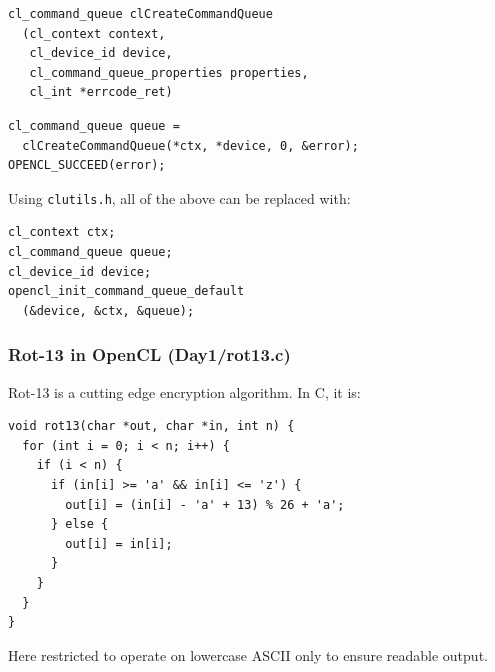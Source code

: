 \documentclass{beamer}
\begin{document}
\begin{frame}

\begin{lstlisting}[backgroundcolor=\color{lightgray}]
cl_command_queue clCreateCommandQueue
  (cl_context context,
   cl_device_id device,
   cl_command_queue_properties properties,
   cl_int *errcode_ret)
\end{lstlisting}

\begin{lstlisting}
cl_command_queue queue =
  clCreateCommandQueue(*ctx, *device, 0, &error);
OPENCL_SUCCEED(error);
\end{lstlisting}

  Using \texttt{clutils.h}, all of the above can be replaced with:

\begin{lstlisting}
cl_context ctx;
cl_command_queue queue;
cl_device_id device;
opencl_init_command_queue_default
  (&device, &ctx, &queue);
\end{lstlisting}

\end{frame}

\begin{frame}[fragile]
  \frametitle{Rot-13 in OpenCL (Day1/rot13.c)}

Rot-13 is a cutting edge encryption algorithm.  In C, it is:

\begin{lstlisting}
void rot13(char *out, char *in, int n) {
  for (int i = 0; i < n; i++) {
    if (i < n) {
      if (in[i] >= 'a' && in[i] <= 'z') {
        out[i] = (in[i] - 'a' + 13) % 26 + 'a';
      } else {
        out[i] = in[i];
      }
    }
  }
}
\end{lstlisting}

Here restricted to operate on lowercase ASCII only to ensure readable
output.

\end{frame}
\end{document}
